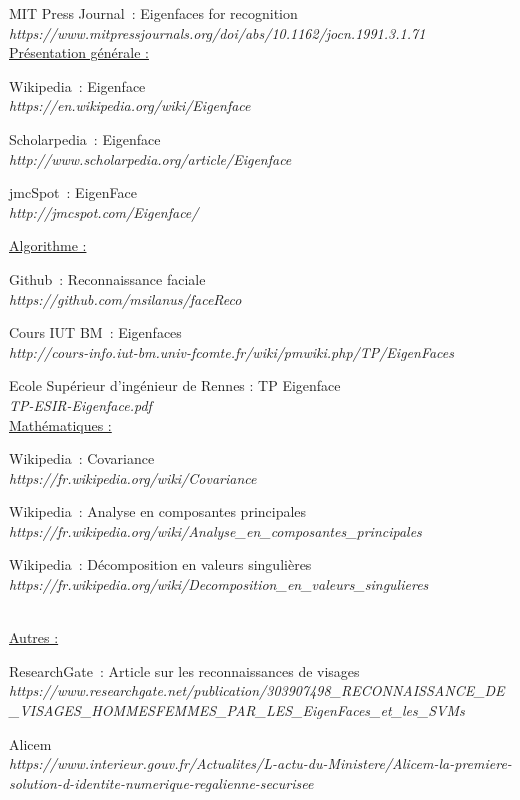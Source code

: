 \documentclass[12pt,french]{article}
\theoremstyle{plain}
\theoremstyle{definition}
\begin{document}
\newpage
\begin{thebibliography}
	\bibitem{}
	MIT Press Journal~: Eigenfaces for recognition
	\\\textit{https://www.mitpressjournals.org/doi/abs/10.1162/jocn.1991.3.1.71}
	\\
	\underline{Présentation générale :}
	
	\bibitem{}
	Wikipedia~: Eigenface
	\\\textit{https://en.wikipedia.org/wiki/Eigenface}
	
	\bibitem{}
	Scholarpedia~: Eigenface
	\\\textit{http://www.scholarpedia.org/article/Eigenface}
	
	\bibitem{}
	jmcSpot~: EigenFace
	\\\textit{http://jmcspot.com/Eigenface/}
	
	\underline{Algorithme :}
	
	\bibitem{}
	Github~: Reconnaissance faciale
	\\\textit{https://github.com/msilanus/faceReco}
	
	\bibitem{}
	Cours IUT BM~: Eigenfaces 
	\\\textit{http://cours-info.iut-bm.univ-fcomte.fr/wiki/pmwiki.php/TP/EigenFaces}
	
	\bibitem{}
	Ecole Supérieur d'ingénieur de Rennes : TP Eigenface
	\\\textit{TP-ESIR-Eigenface.pdf}
	\\
	\underline{Mathématiques :}
	
	\bibitem{}
	Wikipedia~: Covariance
	\\\textit{https://fr.wikipedia.org/wiki/Covariance}
	
	\bibitem{}
	Wikipedia~: Analyse en composantes principales
	\\\textit{https://fr.wikipedia.org/wiki/Analyse_en_composantes_principales}
	
	\bibitem{}
	Wikipedia~: Décomposition en valeurs singulières
	\\\textit{https://fr.wikipedia.org/wiki/Decomposition_en_valeurs_singulieres}
	
	\\
	\underline{Autres :}
	
	\bibitem{}
	ResearchGate~: Article sur les reconnaissances de visages
	\\\textit{https://www.researchgate.net/publication/303907498_RECONNAISSANCE_DE_VISAGES_HOMMESFEMMES_PAR_LES_EigenFaces_et_les_SVMs}
	
	\bibitem{}
	Alicem
	\\\textit{https://www.interieur.gouv.fr/Actualites/L-actu-du-Ministere/Alicem-la-premiere-solution-d-identite-numerique-regalienne-securisee}
	

\end{thebibliography}
\end{document}
